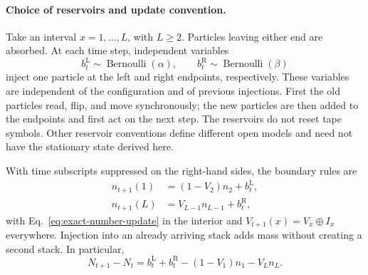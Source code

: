 \documentclass{article}
\begin{document}
\paragraph{Choice of reservoirs and update convention.}
Take an interval $x=1,\ldots,L$, with $L\geq2$.  Particles leaving either end
are absorbed.  At each time step, independent variables
\begin{equation}
b_t^{\mathrm L}\sim\operatorname{Bernoulli}(\alpha),\qquad
b_t^{\mathrm R}\sim\operatorname{Bernoulli}(\beta)
\end{equation}
inject one particle at the left and right endpoints, respectively.  These
variables are independent of the configuration and of previous injections.
First the old particles read, flip, and move synchronously; the new particles
are then added to the endpoints and first act on the next step.  The
reservoirs do not reset tape symbols.  Other reservoir conventions define
different open models and need not have the stationary state derived here.

With time subscripts suppressed on the right-hand sides, the boundary rules
are
\begin{align}
n_{t+1}(1)&=(1-V_2)n_2+b_t^{\mathrm L},\\
n_{t+1}(L)&=V_{L-1}n_{L-1}+b_t^{\mathrm R},
\end{align}
with Eq.~\eqref{eq:exact-number-update} in the interior and
$V_{t+1}(x)=V_x\oplus I_x$ everywhere.  Injection into an already arriving
stack adds mass without creating a second stack.  In particular,
\begin{equation}
N_{t+1}-N_t=b_t^{\mathrm L}+b_t^{\mathrm R}
 -(1-V_1)n_1-V_Ln_L.
\label{eq:open-mass-balance}
\end{equation}
\end{document}

